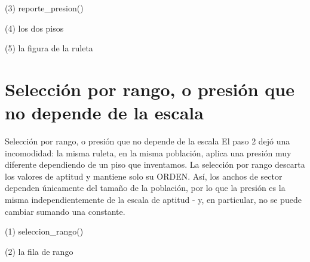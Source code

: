 \begin{frame}[fragile]{(3) reporte\_presion()}

\end{frame}

\begin{frame}[fragile]{(4) los dos pisos}

\end{frame}

\begin{frame}[fragile]{(5) la figura de la ruleta}

\end{frame}


\section{Selección por rango, o presión que no depende de la escala}

\begin{frame}{Selección por rango, o presión que no depende de la escala}
El paso 2 dejó una incomodidad: la misma ruleta, en la misma población, aplica
una presión muy diferente dependiendo de un piso que inventamos. La selección
por rango descarta los valores de aptitud y mantiene solo su ORDEN. Así, los
anchos de sector dependen únicamente del tamaño de la población, por lo que la
presión es la misma independientemente de la escala de aptitud - y, en
particular, no se puede cambiar sumando una constante.
\end{frame}

\begin{frame}[fragile]{(1) seleccion\_rango()}

\end{frame}

\begin{frame}[fragile]{(2) la fila de rango}

\end{frame}

